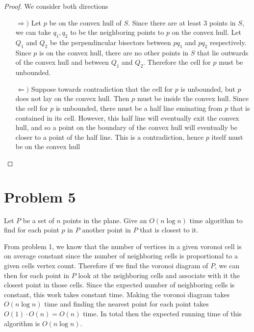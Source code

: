 \documentclass[12pt]{extarticle}
\begin{document}
\begin{proof}
    We consider both directions
    \begin{enumerate}
        \item[$\Rightarrow)$]
            Let $p$ be on the convex hull of $S$. Since there are at least 3 points in $S$, we can take $q_1, q_2$ to be the neighboring points to $p$ on the convex hull. Let $Q_1$ and $Q_2$ be the perpendincular bisectors between $pq_1$ and $pq_2$ respectively. Since $p$ is on the convex hull, there are no other points in $S$ that lie outwards of the convex hull and between $Q_1$ and $Q_2$. Therefore the cell for $p$ must be unbounded.
        \item[$\Leftarrow)$]
            Suppose towards contradiction that the cell for $p$ is unbounded, but $p$ does not lay on the convex hull. Then $p$ must be inside the convex hull. Since the cell for $p$ is unbounded, there must be a half line eminating from $p$ that is contained in its cell. However, this half line will eventually exit the convex hull, and so a point on the boundary of the convex hull will eventually be closer to a point of the half line. This is a contradiction, hence $p$ itself must be on the convex hull \qedhere
    \end{enumerate}
\end{proof}

\section*{Problem 5}
Let $P$ be a set of $n$ points in the plane. Give an $O(n \log n)$ time algorithm to find for each point $p$ in $P$ another point in $P$ that is closest to it.

\begin{solution}
    From problem 1, we know that the number of vertices in a given voronoi cell is on average constant since the number of neighboring cells is proportional to a given cells vertex count. Therefore if we find the voronoi diagram of $P$, we can then for each point in $P$ look at the neighboring cells and associate with it the closest point in those cells. Since the expected number of neighboring cells is constant, this work takes constant time. Making the voronoi diagram takes $O(n \log n)$ time and finding the nearest point for each point takes $O(1) \cdot O(n) = O(n)$ time. In total then the expected running time of this algorithm is $O(n \log n)$.
\end{solution}
\end{document}
